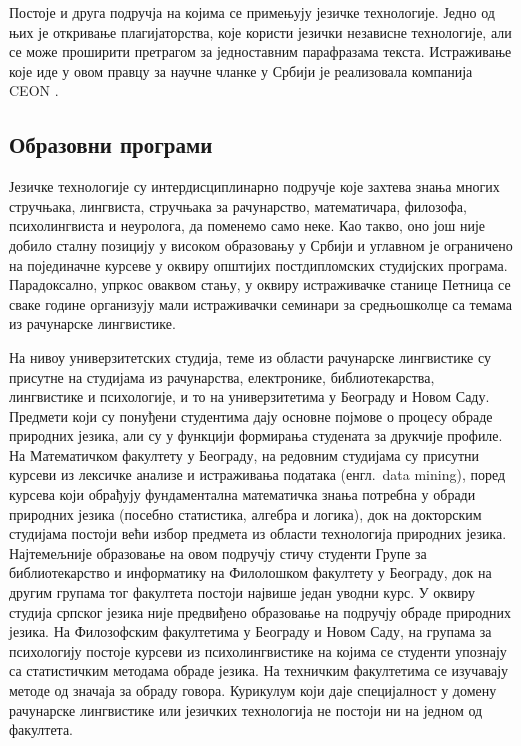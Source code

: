 \begin{multicols}{2}
Постоје и друга подручја на којима се примењују језичке технологије. Једно од њих је откривање плагијаторства, које користи језички независне технологије, али се може проширити  претрагом за једноставним парафразама текста. Истраживање које иде у овом правцу за научне чланке у Србији је реализовала компанија CEON \cite{CEON}.

 \subsection {Образовни програми}
 
Језичке технологије су интердисциплинарно подручје које захтева знања многих стручњака, лингвиста, стручњака за рачунарство, математичара, филозофа, психолингвиста и неуролога, да поменемо само неке. Као такво, оно још није добило сталну позицију у високом образовању у Србији и углавном је ограничено на појединачне курсеве у оквиру општијих постдипломских студијских програма. Парадоксално, упркос оваквом стању, у оквиру истраживачке станице Петница \cite{PETNICA} се сваке године организују мали истраживачки семинари за средњошколце са темама из рачунарске лингвистике. 

На нивоу универзитетских студија, теме из области рачунарске лингвистике су присутне на студијама из рачунарства, електронике, библиотекарства, лингвистике и психологије, и то на универзитетима у Београду и Новом Саду. Предмети који су понуђени студентима дају основне појмове о процесу обраде природних језика, али су у функцији формирања студената за друкчије профиле. На Математичком факултету у Београду, на редовним студијама су присутни курсеви из лексичке анализе и истраживања података (енгл.~data mining), поред курсева који обрађују фундаментална математичка знања потребна у обради природних језика (посебно статистика, алгебра и логика), док на докторским студијама постоји већи избор предмета из области технологија природних језика. Најтемељније образовање на овом подручју стичу студенти Групе за библиотекарство и информатику на Филолошком факултету у Београду, док на другим групама тог факултета постоји највише један уводни курс. У оквиру студија српског језика није предвиђено образовање на подручју обраде природних језика. На Филозофским факултетима у Београду и Новом Саду, на групама за психологију постоје курсеви из психолингвистике на којима се студенти упознају са статистичким методама обраде језика. На техничким факултетима се изучавају методе од значаја за обраду говора. Курикулум који даје специјалност у домену рачунарске лингвистике или језичких технологија не постоји ни на једном од факултета. 


\end{multicols}
